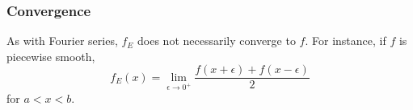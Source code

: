 \documentclass{article}
\begin{document}
\subsubsection{Convergence}
As with Fourier series, \(f_E\) does not necessarily converge to \(f\). For instance,
if \(f\) is piecewise smooth,
\begin{equation*}
    f_E\left( x \right) = \lim_{\epsilon \to 0^+} \frac{f\left( x + \epsilon \right) + f\left( x - \epsilon \right)}{2}
\end{equation*}
for \(a < x < b\).
\end{document}

